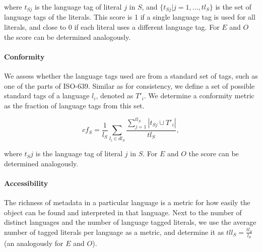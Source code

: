 \noindent where $t_{Sj}$ is the language tag of literal $j$ in $S$, and $\{t_{Sj}| j=1, \ldots, tl_S \}$ is the set of language tags of the literals. This score is 1 if a single language tag is used for all literals, and close to 0 if each literal uses a different language tag. For $E$ and $O$ the score can be determined analogously.

\paragraph{Conformity}

We assess whether the language tags used are from a standard set of tags, such as one of the parts of ISO-639. Similar as for consistency, we define a set of possible standard tags of a language $l_i$, denoted as $T'_i$. We determine a conformity metric as the fraction of language tags from this set. 

\begin{equation}
cf_S = \frac{1}{l_S} \sum_{l_i \in dl_S} \frac{\sum_{j=1}^{tl_S} |t_{Sj} \cup {T'_i}| }{tl_S},
\end{equation}

\noindent where $t_Sj$ is the language tag of literal $j$ in $S$. For $E$ and $O$ the score can be determined analogously.

\paragraph{Accessibility} The richness of metadata in a particular language is a metric for how easily the object can be found and interpreted in that language. Next to the number of distinct languages and the number of language tagged literals, we use the average number of tagged literals per language as a metric, and determine it as $tll_S = \frac{tl_S}{l_S}$ (an analogously for $E$ and $O$).


